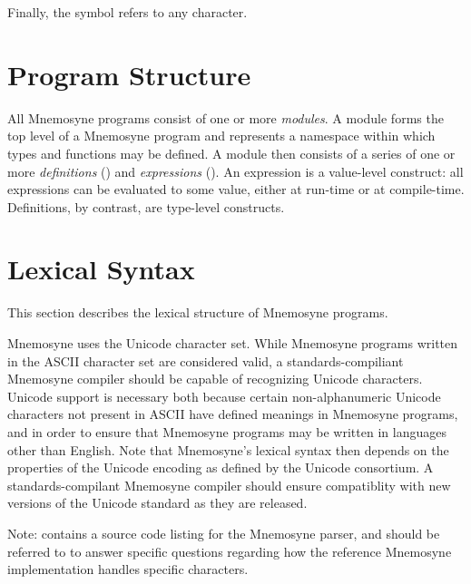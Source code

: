Finally, the symbol  refers to any character.

\section{Program Structure}

All Mnemosyne programs consist of one or more \textit{modules}. A module forms the top level of a Mnemosyne program and represents a namespace within which types and functions may be defined. A module then consists of a series of one or more \textit{definitions} () and \textit{expressions} (). An expression is a value-level construct: all expressions can be evaluated to some value, either at run-time or at compile-time. Definitions, by contrast, are type-level constructs.

\section{Lexical Syntax}\label{sec:lexical}
This section describes the lexical structure of Mnemosyne programs.

Mnemosyne uses the Unicode character set. While Mnemosyne programs written in the ASCII character set are considered valid, a standards-compiliant Mnemosyne compiler should be capable of recognizing Unicode characters. Unicode support is necessary both because certain non-alphanumeric Unicode characters not present in ASCII have defined meanings in Mnemosyne programs, and in order to ensure that Mnemosyne programs may be written in languages other than English. Note that Mnemosyne's lexical syntax then depends on the properties of the Unicode encoding as defined by the Unicode consortium. A standards-compilant Mnemosyne compiler should ensure compatiblity with new versions of the Unicode standard as they are released.

Note:  contains a source code listing for the Mnemosyne parser, and should be referred to to answer specific questions regarding how the reference Mnemosyne implementation handles specific characters.

